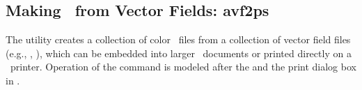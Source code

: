 
\subsection{Making \postscript\ from Vector Fields:
            avf2ps}\label{sec:avf2ps}%

The  utility creates a
collection of color \eps\ files from a collection of
vector field files (e.g., , ), which can be embedded
into larger \postscript\ documents or printed directly on a \postscript\
printer.  Operation of the  command is modeled after the
{} and the print
dialog box in {}.

